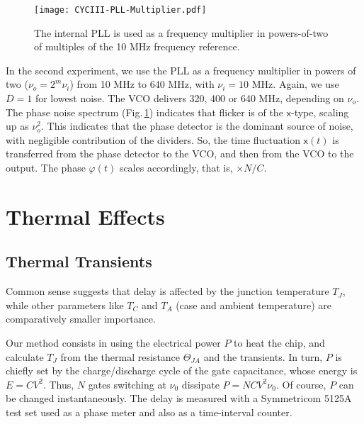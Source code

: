 \documentclass{article}
\begin{document}
\begin{figure}[t]
\centering\texttt{[image: CYCIII-PLL-Multiplier.pdf]}
\caption{The internal PLL is used as a frequency multiplier in powers-of-two of multiples of the 10 MHz frequency reference.}
\label{fig:CYCIII-PLL-Multiplier}
\end{figure}
In the second experiment, we use the PLL as a frequency multiplier in powers of two ($\nu_o=2^m\nu_i$) from 10 MHz to 640 MHz, with $\nu_i=10$ MHz.
Again, we use $D=1$ for lowest noise.  
The VCO delivers 320, 400 or 640 MHz, depending on $\nu_o$.
The phase noise spectrum (Fig.\,\ref{fig:CYCIII-PLL-Multiplier})
indicates that flicker is of the $\mathsf{x}$-type, scaling up as $\nu_o^2$.  This indicates that the phase detector is the dominant source of noise, with negligible contribution of the dividers.  So, the time fluctuation $\mathsf{x}(t)$ is transferred from the phase detector to the VCO, and then from the VCO to the output.  The phase $\varphi(t)$ scales accordingly, that is, $\times N/C$. 




\section{Thermal Effects}\label{sec:Thermal-effects}

\subsection{Thermal Transients}\label{sec:Thermal-transients}
Common sense suggests that delay is affected by the junction temperature $T_J$, while other parameters like $T_C$ and $T_A$ (case and ambient temperature) are comparatively smaller importance.

Our method consists in using the electrical power $P$ to heat the chip, and calculate $T_J$ from the thermal resistance $\Theta_{JA}$ and the transients.
In turn, $P$ is chiefly set by the charge/discharge cycle of the gate capacitance, whose energy is $E=CV^2$.  Thus, $N$ gates switching at $\nu_0$ dissipate $P=NCV^2\nu_0$. Of course, $P$ can be changed instantaneously.
The delay is measured with a Symmetricom 5125A test set used as a phase meter and also as a time-interval counter.
\end{document}
